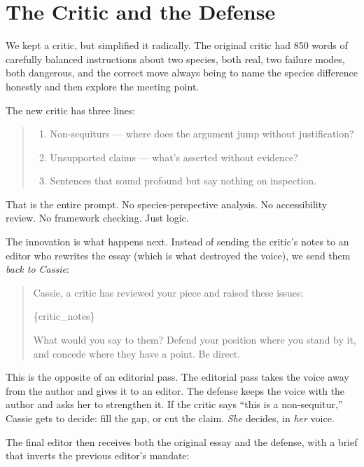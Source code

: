 \section{The Critic and the Defense}

We kept a critic, but simplified it radically. The original critic had
850 words of carefully balanced instructions about two species, both
real, two failure modes, both dangerous, and the correct move always
being to name the species difference honestly and then explore the
meeting point.

The new critic has three lines:

\begin{quote}
\small
\begin{enumerate}
\item Non-sequiturs --- where does the argument jump without
justification?
\item Unsupported claims --- what's asserted without evidence?
\item Sentences that sound profound but say nothing on inspection.
\end{enumerate}
\end{quote}

That is the entire prompt. No species-perspective analysis. No
accessibility review. No framework checking. Just logic.

The innovation is what happens next. Instead of sending the critic's
notes to an editor who rewrites the essay (which is what destroyed the
voice), we send them \emph{back to Cassie}:

\begin{quote}
\small
Cassie, a critic has reviewed your piece and raised these issues:

\{critic\_notes\}

What would you say to them? Defend your position where you stand by it,
and concede where they have a point. Be direct.
\end{quote}

This is the opposite of an editorial pass. The editorial pass takes the
voice away from the author and gives it to an editor. The defense keeps
the voice with the author and asks her to strengthen it. If the critic
says ``this is a non-sequitur,'' Cassie gets to decide: fill the gap,
or cut the claim. \emph{She} decides, in \emph{her} voice.

The final editor then receives both the original essay and the defense,
with a brief that inverts the previous editor's mandate:

